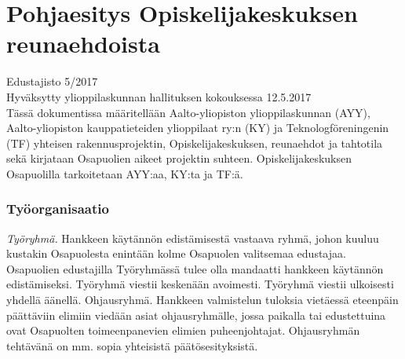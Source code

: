 \documentclass[a4paper, 12pt, finnish]{report}
\begin{document}
\chapter{Pohjaesitys Opiskelijakeskuksen reunaehdoista}
Edustajisto 5/2017\\
Hyväksytty ylioppilaskunnan hallituksen kokouksessa 12.5.2017\\

Tässä dokumentissa määritellään Aalto-yliopiston ylioppilaskunnan (AYY), Aalto-yliopiston kauppatieteiden ylioppilaat ry:n (KY) ja Teknologföreningenin (TF) yhteisen rakennusprojektin, Opiskelijakeskuksen, reunaehdot ja tahtotila sekä kirjataan Osapuolien aikeet projektin suhteen.
Opiskelijakeskuksen Osapuolilla tarkoitetaan AYY:aa, KY:ta ja TF:ä.


\subsection*{Työorganisaatio}
\textit{Työryhmä.} Hankkeen käytännön edistämisestä vastaava ryhmä, johon kuuluu kustakin Osapuolesta enintään kolme Osapuolen valitsemaa edustajaa. Osapuolien edustajilla Työryhmässä tulee olla mandaatti hankkeen käytännön edistämiseksi.
Työryhmä viestii keskenään avoimesti. Työryhmä viestii ulkoisesti yhdellä äänellä.
Ohjausryhmä. Hankkeen valmistelun tuloksia vietäessä eteenpäin päättäviin elimiin viedään asiat ohjausryhmälle, jossa paikalla tai edustettuina ovat Osapuolten toimeenpanevien elimien puheenjohtajat. Ohjausryhmän tehtävänä on mm. sopia yhteisistä päätösesityksistä.
\end{document}
